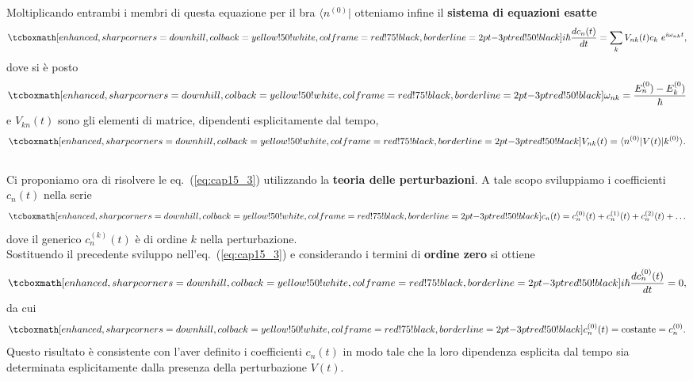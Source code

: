 \documentclass[a4paper,12pt,oneside]{book}
\begin{document}
Moltiplicando entrambi i membri di questa equazione per il bra $\langle n^{(0)} \vert$ otteniamo infine il \textbf{sistema di equazioni esatte}
	\begin{equation}
		\tcboxmath[enhanced, sharp corners=downhill, colback=yellow!50!white, colframe=red!75!black, borderline={2pt}{-3pt}{red!50!black}]{
			i\hbar \frac{dc_n (t)}{dt} = \sum _ k V_{nk} (t) c_k\ e^{i\omega _{nk}t } ,
			}
	\label{eq:cap15_3}
	\end{equation}
dove si è posto
	\begin{equation}
		\tcboxmath[enhanced, sharp corners=downhill, colback=yellow!50!white, colframe=red!75!black, borderline={2pt}{-3pt}{red!50!black}]{
			\omega _{nk} = \frac{E_n ^{(0})-E_k ^{(0})}{\hbar}
			}
	\end{equation}
e $V_{kn} (t)$ sono gli elementi di matrice, dipendenti esplicitamente dal tempo,
	\begin{equation}
		\tcboxmath[enhanced, sharp corners=downhill, colback=yellow!50!white, colframe=red!75!black, borderline={2pt}{-3pt}{red!50!black}]{
			V_{nk} (t) = \langle n ^{(0)} \vert V(t) \vert k ^{(0)} \rangle .
			}
	\end{equation}\\
	
Ci proponiamo ora di risolvere le eq.~(\ref{eq:cap15_3}) utilizzando la \textbf{teoria delle perturbazioni}. A tale scopo sviluppiamo i coefficienti $c_n (t)$ nella serie
	\begin{equation}
		\tcboxmath[enhanced, sharp corners=downhill, colback=yellow!50!white, colframe=red!75!black, borderline={2pt}{-3pt}{red!50!black}]{
			c_n (t) = c_n ^{(0)}(t)+c_n ^{(1)}(t)+c_n ^{(2)}(t)+\dots
			}
	\end{equation}
dove il generico $c_n ^{(k)}(t)$ è di ordine $k$ nella perturbazione.\\

Sostituendo il precedente sviluppo nell'eq.~(\ref{eq:cap15_3}) e considerando i termini di \textbf{ordine zero} si ottiene
	\begin{equation}
		\tcboxmath[enhanced, sharp corners=downhill, colback=yellow!50!white, colframe=red!75!black, borderline={2pt}{-3pt}{red!50!black}]{
			i\hbar \frac{d c_n ^{(0)}(t)}{dt}=0 ,
			}
	\end{equation}
da cui
	\begin{equation}
		\tcboxmath[enhanced, sharp corners=downhill, colback=yellow!50!white, colframe=red!75!black, borderline={2pt}{-3pt}{red!50!black}]{
			c_n ^{(0)}(t) = \textrm{costante}= c_n ^{(0)} .
			}
	\label{eq:cap15_4}
	\end{equation}
Questo risultato è consistente con l'aver definito i coefficienti $c_n (t)$ in modo tale che la loro dipendenza esplicita dal tempo sia determinata esplicitamente dalla presenza della perturbazione $V(t)$.\\
\end{document}
